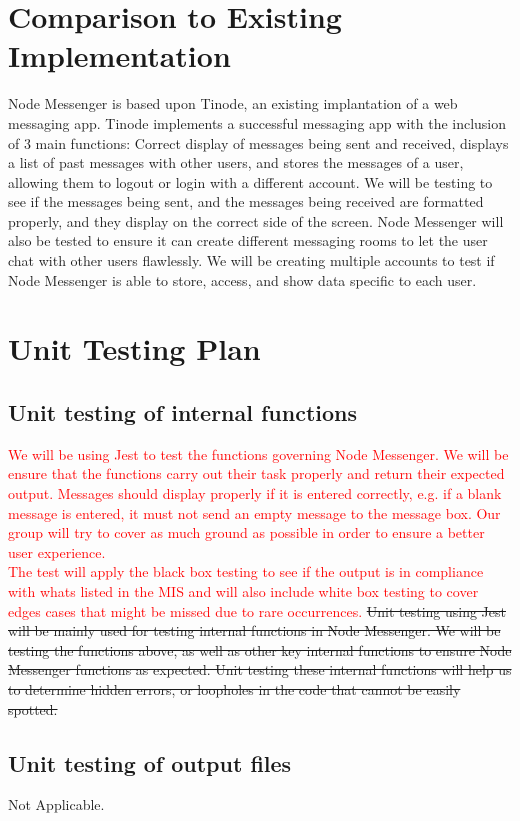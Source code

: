 \documentclass[12pt, titlepage]{article}
\begin{document}
\section{Comparison to Existing Implementation}	
Node Messenger is based upon Tinode, an existing implantation of a web messaging app. Tinode implements a successful messaging app with the inclusion of 3 main functions: Correct display of messages being sent and received, displays a list of past messages with other users, and stores the messages of a user, allowing them to logout or login with a different account. We will be testing to see if the messages being sent, and the messages being received are formatted properly, and they display on the correct side of the screen. Node Messenger will also be tested to ensure it can create different messaging rooms to let the user chat with other users flawlessly. We will be creating multiple accounts to test if Node Messenger is able to store, access, and show data specific to each user.  
				
\section{Unit Testing Plan}

\subsection{Unit testing of internal functions}
\textcolor{red}{
We will be using Jest to test the functions governing Node Messenger. We will be ensure that the functions carry out their task properly and return their expected output.  Messages should display properly if it is entered correctly, e.g. if a blank message is entered, it must not send an empty message to the message box. Our group will try to cover as much ground as possible in order to ensure a better user experience. \\
The test will apply the black box testing to see if the output is in compliance with whats listed in the MIS and will also include white box testing to cover edges cases that might be missed due to rare occurrences.
}
\sout{Unit testing using Jest will be mainly used for testing internal functions in Node Messenger. We will be testing the functions above, as well as other key internal functions to ensure Node Messenger functions as expected. Unit testing these internal functions will help us to determine hidden errors, or loopholes in the code that cannot be easily spotted.}

\subsection{Unit testing of output files}	
Not Applicable.	
\end{document}
